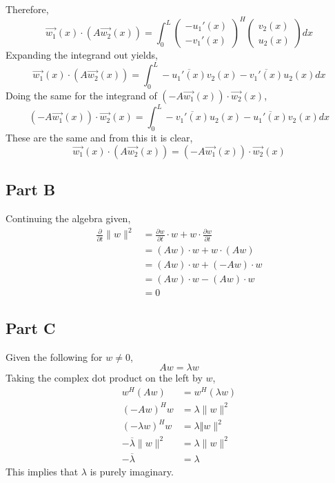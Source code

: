 \documentclass{article}
\begin{document}
Therefore,
$$ \vec{w_1}(x) \cdot \left(A \vec{w_2}(x)\right) = \int_0^L \begin{pmatrix}
    - u_1'(x) \\
    - v_1'(x)
  \end{pmatrix}^H \begin{pmatrix}
    v_2(x) \\
    u_2(x)
  \end{pmatrix} dx $$
Expanding the integrand out yields,
$$ \vec{w_1}(x) \cdot \left(A \vec{w_2}(x)\right) = \int_0^L -\overline{u_1'(x)}
v_2(x) - \overline{v_1'(x)} u_2(x) dx $$
Doing the same for the integrand of $\left(-A \vec{w_1}(x)\right) \cdot
\vec{w_2}(x)$,
$$ \left(-A \vec{w_1}(x)\right) \cdot \vec{w_2}(x) = \int_0^L -\overline{v_1'(x)}
u_2(x) - \overline{u_1'(x)} v_2(x) dx $$
These are the same and from this it is clear,
$$ \vec{w_1}(x) \cdot \left(A \vec{w_2}(x)\right) = \left(-A
\vec{w_1}(x)\right) \cdot \vec{w_2}(x) $$

\subsection*{Part B}

Continuing the algebra given,
\begin{align*}
  \frac{\partial}{\partial t} \lVert w \rVert^2 &= \frac{\partial w}{\partial
  t} \cdot w + w \cdot \frac{\partial w}{\partial t} \\
  &= \left(A w\right) \cdot w + w \cdot \left(A w\right) \\
  &= (A w) \cdot w + (-A w) \cdot w \\
  &= (A w) \cdot w - (A w) \cdot w \\
  &= 0
\end{align*}

\subsection*{Part C}

Given the following for $w \neq 0$,
$$ A w = \lambda w $$
Taking the complex dot product on the left by $w$,
\begin{align*}
  w^H (A w) &= w^H (\lambda w) \\
  (-A w)^H w &= \lambda \lVert w \rVert^2 \\
  (-\lambda w)^H w &= \lambda \Vert w \rVert^2 \\
  -\overline{\lambda} \lVert w \rVert^2 &=  \lambda \lVert w \rVert^2 \\
  -\overline{\lambda} &= \lambda
\end{align*}
This implies that $\lambda$ is purely imaginary.
\end{document}
